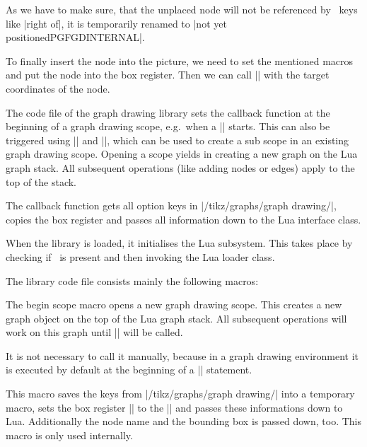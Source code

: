 As we have to make sure, that the unplaced node will not be referenced
by \tikzname\ keys like |right of|, it is temporarily renamed to
|not yet positionedPGFGDINTERNAL|.

To finally
insert the node into the picture, we need to set the mentioned macros
and put the node into the box register. Then we can call
|\pgfpositionnodenow| with the target coordinates of the node.

The code file of the graph drawing library sets the callback function
at the beginning of a graph drawing scope, e.g.\ when a |\graph|
starts. This can also be triggered using |\pgfgdbeginscope| and
|\pgfgdendscope|, which can be used to create a sub scope in an
existing graph drawing scope. Opening a scope yields in creating a new
graph on the Lua graph stack. All subsequent operations (like adding
nodes or edges) apply to the top of the stack. 


The callback function gets all option keys in
|/tikz/graphs/graph drawing/|, copies the box register and passes all information down to the Lua interface class.

When the library is loaded, it initialises the Lua subsystem. This takes place by checking if \LuaTeX\ is present and then invoking the Lua loader class. 

The library code file consists mainly the following macros:

\begin{command}{\pgfgdbeginscope}
  The begin scope macro opens a new graph drawing scope. This creates a new graph object on the top of the Lua graph stack. All subsequent operations will work on this graph until |\pgfgdendscope| will be called.

It is not necessary to call it manually, because in a graph drawing environment it is executed by default at the beginning of a |\graph| statement.
\end{command}


\makeatletter
\begin{command}{\pgf@gd@positionnode@callback}
  This macro saves the keys from |/tikz/graphs/graph drawing/| into a temporary macro, sets the box register |\pgf@gd@box| to the |\pgfpositionnodelaterbox| and passes these informations down to Lua. Additionally the node name and the bounding box is passed down, too. This macro is only used internally.
\end{command}
\makeatother

